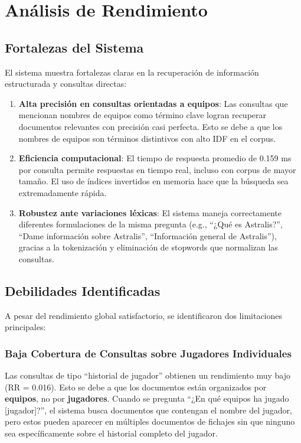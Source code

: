 \section{Análisis de Rendimiento}

\subsection{Fortalezas del Sistema}

El sistema muestra fortalezas claras en la recuperación de información estructurada y consultas directas:

\begin{enumerate}
    \item \textbf{Alta precisión en consultas orientadas a equipos}: Las consultas que mencionan nombres de equipos como término clave logran recuperar documentos relevantes con precisión casi perfecta. Esto se debe a que los nombres de equipos son términos distintivos con alto IDF en el corpus.
    
    \item \textbf{Eficiencia computacional}: El tiempo de respuesta promedio de 0.159 ms por consulta permite respuestas en tiempo real, incluso con corpus de mayor tamaño. El uso de índices invertidos en memoria hace que la búsqueda sea extremadamente rápida.
    
    \item \textbf{Robustez ante variaciones léxicas}: El sistema maneja correctamente diferentes formulaciones de la misma pregunta (e.g., ``¿Qué es Astralis?'', ``Dame información sobre Astralis'', ``Información general de Astralis''), gracias a la tokenización y eliminación de stopwords que normalizan las consultas.
\end{enumerate}

\subsection{Debilidades Identificadas}

A pesar del rendimiento global satisfactorio, se identificaron dos limitaciones principales:

\subsubsection{Baja Cobertura de Consultas sobre Jugadores Individuales}

Las consultas de tipo ``historial de jugador'' obtienen un rendimiento muy bajo (RR = 0.016). Esto se debe a que los documentos están organizados por \textbf{equipos}, no por \textbf{jugadores}. Cuando se pregunta ``¿En qué equipos ha jugado [jugador]?'', el sistema busca documentos que contengan el nombre del jugador, pero estos pueden aparecer en múltiples documentos de fichajes sin que ninguno sea específicamente sobre el historial completo del jugador.

